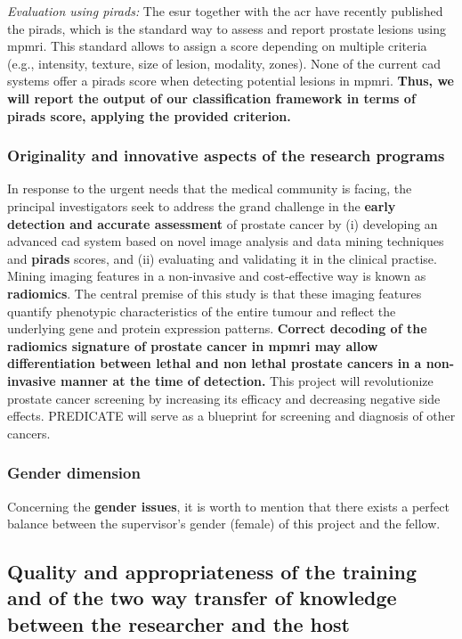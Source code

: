 \emph{Evaluation using \acs*{pirads}:}
The \ac{esur} together with the \ac{acr} have recently published the \ac{pirads}, which is the standard way to assess and report prostate lesions using \ac{mpmri}.
This standard allows to assign a score depending on multiple criteria (e.g., intensity, texture, size of lesion, modality, zones).
None of the current \ac{cad} systems offer a \ac{pirads} score when detecting potential lesions in \ac{mpmri}.
\textbf{Thus, we will report the output of our classification framework in terms of \ac{pirads} score, applying the provided criterion.}

\subsubsection{Originality and innovative aspects of the research programs}

In response to the urgent needs that the medical community is facing, the principal investigators seek to address the grand challenge in the \textbf{early detection and accurate assessment} of prostate cancer by (i) developing an advanced \ac{cad} system based on novel image analysis and data mining techniques and \textbf{\ac{pirads}} scores, and (ii) evaluating and validating it in the clinical practise. 
Mining imaging features in a non-invasive and cost-effective way is known as \textbf{radiomics}.
The central premise of this study is that these imaging features quantify phenotypic characteristics of the entire tumour and reflect the underlying gene and protein expression patterns.
\textbf{Correct decoding of the radiomics signature of prostate cancer in \ac{mpmri} may allow differentiation between lethal and non lethal prostate cancers in a non-invasive manner at the time of detection.}
This project will revolutionize prostate cancer screening by increasing its efficacy and decreasing negative side effects.
PREDICATE will serve as a blueprint for screening and diagnosis of other cancers.

\subsubsection{Gender dimension}

Concerning the \textbf{gender issues}, it is worth to mention that there exists a perfect balance between the supervisor's gender (female) of this project and the fellow.

\subsection{Quality and appropriateness of the training and of the two way transfer of knowledge between the researcher and the host}
\label{sec:transfer}

